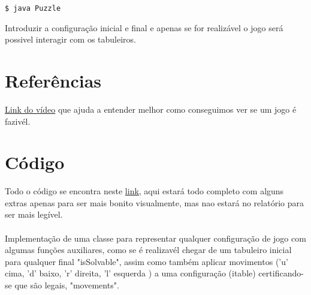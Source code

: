 \documentclass[12pt]{article}
\begin{document}
\begin{verbatim}
$ java Puzzle
\end{verbatim}

Introduzir a configuração inicial e final e apenas se for realizável o jogo será possivel interagir com os tabuleiros.

\section{Referências}

\href{https://youtu.be/YI1WqYKHi78}{Link do vídeo} que ajuda a entender melhor como conseguimos ver se um jogo é fazivél.

\section{Código}
Todo o código se encontra neste 
\href{https://uporto-my.sharepoint.com/:f:/g/personal/up202104797_up_pt/Ep9LE7M38mhKmNeU8LD1JgkBAHS8VuRFmtuByZFLVfADSg?e=8jckQC}{link}, aqui estará todo completo com alguns extras apenas para ser mais bonito visualmente, mas nao estará no relatório para ser mais legível.
\paragraph{}
Implementação de uma classe para representar qualquer configuração de jogo com algumas funções auxiliares, como se é realizavél chegar de um tabuleiro inicial para qualquer final "isSolvable", assim como também aplicar movimentos ('u' cima, 'd' baixo, 'r' direita, 'l' esquerda ) a uma configuração (itable) certificando-se que são legais, "movements".
\end{document}
